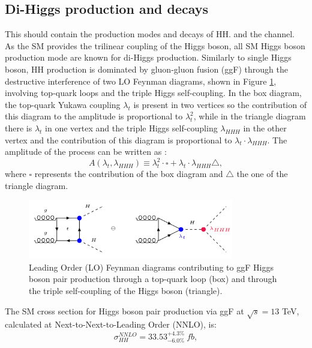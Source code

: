 \subsection{Di-Higgs production and decays} 
\label{chap1:HH:HPD}
This should contain the production modes and decays of HH. and the \HHyybb channel.
\\
As the SM provides the trilinear coupling of the Higgs boson, all SM Higgs boson production mode are known for di-Higgs production. Similarly to single Higgs boson, HH production is dominated by gluon-gluon fusion (ggF) through the destructive interference of two LO Feynman diagrams, shown in Figure \ref{fig:chap1:HH:HPD:FY}, involving top-quark loops and the triple Higgs self-coupling. In the box diagram, the top-quark Yukawa coupling $\lambda_t$ is present in two vertices so the contribution of this diagram to the amplitude is proportional to $\lambda_t^2$, while in the triangle diagram there is $\lambda_t$ in one vertex and the triple Higgs self-coupling $\lambda_{HHH}$ in the other vertex and the contribution of this diagram is proportional to $\lambda_t\cdot\lambda_{HHH}$. The amplitude of the process can be written as :
\begin{equation}
    A(\lambda_t, \lambda_{HHH}) \equiv \lambda_t^2\cdot\square + \lambda_t\cdot\lambda_{HHH}\bigtriangleup,
\end{equation}
where $\square$ represents the contribution of the box diagram and $\bigtriangleup$ the one of the triangle diagram. 
\begin{figure}[H]
    \centering
    \includegraphics[width=0.8\textwidth]{Ch1/Img/HH_feyn.png}
    \caption{Leading Order (LO) Feynman diagrams contributing to ggF Higgs boson pair production through a top-quark loop (box) and through the triple self-coupling of the Higgs boson (triangle).}
    \label{fig:chap1:HH:HPD:FY}
\end{figure}
The SM cross section for Higgs boson pair production via ggF at $\sqrt{s}=13$ TeV, calculated at Next-to-Next-to-Leading Order (NNLO), is:
\begin{equation}
    \sigma_{HH}^{NNLO} = 33.53_{-6.0\%}^{+4.3\%} \ fb,
    \label{eq:chap1:HH:XSEC:NNL0}
\end{equation}
